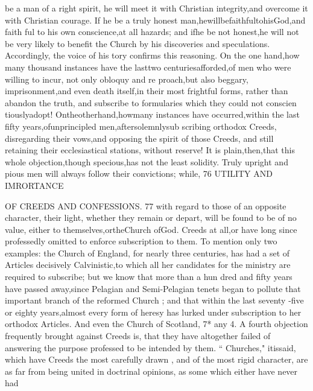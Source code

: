 \documentclass[
]{book}
\begin{document}
be a man of a right spirit, he will meet it with Christian integrity,and overcome it with
Christian courage. If he be a truly honest man,hewillbefaithfultohisGod,and faith
ful to his own conscience,at all hazards; and ifhe be not honest,he will not be very likely
to benefit the Church by his discoveries and speculations. Accordingly, the voice of his
tory confirms this reasoning. On the one hand,how many thousand instances have the lasttwo centuriesafforded,of men who were willing to incur, not only obloquy and re proach,but also beggary, imprisonment,and even death itself,in their most frightful forms, rather than abandon the truth, and subscribe to formularies which they could not conscien tiouslyadopt! Ontheotherhand,howmany instances have occurred,within the last fifty years,ofunprincipled men,aftersolemnlysub scribing orthodox Creeds, disregarding their vows,and opposing the spirit of those Creeds, and still retaining their ecclesiastical stations, without reserve! It is plain,then,that this whole objection,though specious,has not the
least solidity. Truly upright and pious men will always follow their convictions; while,
76
UTILITY AND IMRORTANCE

OF CREEDS AND CONFESSIONS. 77
with regard to those of an opposite character,
their light, whether they remain or depart, will be found to be of no value, either to themselves,ortheChurch ofGod.
Creeds
at all,or have long since professedly omitted to enforce subscription to them. To mention
only two examples: the Church of England, for nearly three centuries, has had a set of Articles decisively Calvinistic,to which all her candidates for the ministry are required to subscribe; but we know that more than a hun dred and fifty years have passed away,since Pelagian and Semi-Pelagian tenets began to pollute that important branch of the reformed Church ; and that within the last seventy -five or eighty years,almost every form of heresy has lurked under subscription to her orthodox Articles. And even the Church of Scotland,
7*
any
4. A fourth objection frequently brought
against Creeds is, that they have altogether
failed of answering the purpose professed to
be intended by them. `` Churches," itissaid, which have Creeds the most carefully drawn ,
and of the most rigid character, are as far
from being united in doctrinal opinions, as some which either have never had
\end{document}
